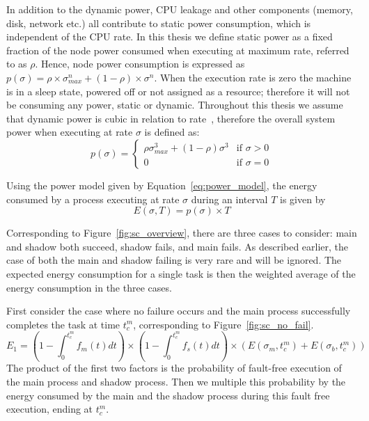 In addition to the dynamic power, CPU leakage and other components
(memory, disk, network etc.) all contribute to static power
consumption, which is independent of the CPU rate. In this thesis we
define static power as a fixed fraction of the node power consumed
when executing at maximum rate, referred to as $\rho$. Hence, node power consumption is expressed as
$p(\sigma)=\rho \times \sigma_{max}^n + (1-\rho)\times \sigma^n$. When the execution rate is zero
the machine is in a sleep state, powered off or not assigned as a
resource; therefore it will not be consuming any power, static or
dynamic.  Throughout this thesis we assume that dynamic power is cubic
in relation to
rate~\cite{rusu2003maximizing,zhai2004theoretical}, therefore the
overall system power when executing at rate $\sigma$ is defined as:
\begin{equation}
p(\sigma) = \begin{cases} \rho \sigma_{max}^3 + (1-\rho) \sigma^3 & \mbox{if } \sigma > 0 \\ 
                          0 & \mbox{if } \sigma = 0 \end{cases}
\label{eq:power_model}
\end{equation}

Using the power model given by Equation~\ref{eq:power_model}, the
energy consumed by a process executing at rate $\sigma$ during an
interval $T$ is given by
\begin{equation}
E(\sigma,T) = p(\sigma) \times T
\end{equation}


Corresponding to Figure~\ref{fig:sc_overview}, there are three cases to consider: main and shadow both succeed, shadow fails, 
and main fails. As described earlier, the case of both the main and
shadow failing is very rare and will be ignored. The expected
energy consumption for a single task is then the weighted average of
the energy consumption in the three cases.

First consider the case where no failure occurs and the main process
successfully completes the task at time $t_c^m$, corresponding to Figure~\ref{fig:sc_no_fail}.
\begin{equation}
E_1 =  ( 1-\int_0^{t_c^m}f_m(t)dt) \times (1 - \int_0^{t_c^m} f_s(t)dt) \times (  E(\sigma_m,t_c^m) + E(\sigma_b,t_c^m))
\label{eq:energy_no_failure}
\end{equation}
The product of the first two factors is the probability of fault-free execution of the main
process and shadow process. Then we multiple this probability by the
energy consumed by the main and the shadow process during this fault
free execution, ending at $t_c^m$.

